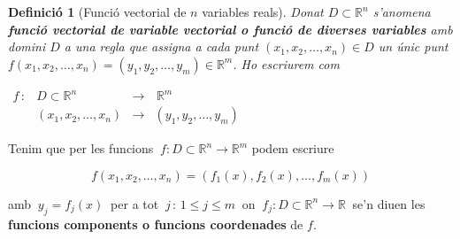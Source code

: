 \documentclass[12pt]{article}
\newcommand{\observacio}{\textbf{Observaci{\'o}}\ \ }
\newtheorem{definicio}{Definici{\'o}}[subsection]
\newcommand{\R}{\mathbb{R}}
\begin{document}
\vspace{0.4cm}
\begin{definicio}[Funci{\'o} vectorial de $n$ variables reals] Donat $D\subset \R^n$ s'anomena \textbf{funci{\'o} vectorial de
variable vectorial o funci{\'o} de diverses variables} amb domini $D$ a una regla que assigna a cada
punt $(x_1,x_2,\ldots ,x_n)\in D$ un {\'u}nic punt $f(x_1,x_2,\ldots
,x_n)=(y_1,y_2,\ldots ,y_m)\in\R^m$. Ho escriurem com


\hspace{3cm}
$
\begin{array}{cccc}
f\, :& D\subset \R^n\, & \longrightarrow & \,\R^m \\
&(x_1,x_2,\ldots ,x_n) &\longrightarrow & (y_1,y_2,\ldots ,y_m)
\end{array}
$
\end{definicio}

\vspace{0.4cm}
Tenim que per les funcions $\ f:D\subset\R^n
\longrightarrow\R^m$ podem escriure

$$ f(x_1,x_2,\ldots ,x_n)=(f_1(x),
f_2(x),\ldots ,f_m(x))$$

amb $\ y_j=f_j(x)\ $ per a tot $\ j\, :\, 1\leq
j\leq m\ $ on $\ f_j:D\subset\R^n \longrightarrow\R\ $ se'n diuen
les \textbf{funcions components o funcions coordenades} de $f$.




\end{document}
